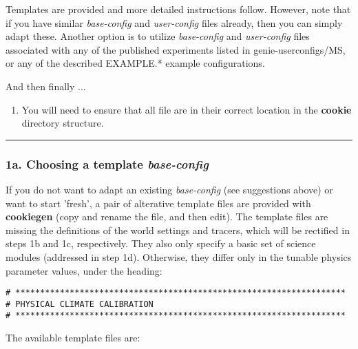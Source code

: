 Templates are provided and more detailed instructions follow. However, note that if you have similar \textit{base-config} and \textit{user-config} files already, then you can simply adapt these. Another option is to utilize \textit{base-config} and \textit{user-config} files associated with any of the published experiments listed in \textsf{\footnotesize genie-userconfigs/MS}, or any of the described \textsf{\footnotesize EXAMPLE.*} example configurations.

\vspace{1mm}
And then finally ...
\begin{enumerate}[noitemsep]
\vspace{1mm}
\setcounter{enumi}{2}
\item You will need to ensure that all file are in their correct location in the \textbf{cookie} directory structure.
\end{enumerate}
\vspace{1mm}

%
\noindent\rule{4cm}{0.5pt}
\subsubsection{1a. Choosing a template \textit{base-config}}

If you do not want to adapt an existing \textit{base-config} (see suggestions above) or want to start 'fresh', a pair of alterative template files are provided with \textbf{cookiegen} (copy and rename the file, and then edit). The template files are missing the definitions of the world settings and tracers, which will be rectified in steps 1b and 1c, respectively. They also only specify a basic set of science modules (addressed in step 1d). Otherwise, they differ only in the tunable physics parameter values, under the heading:

\footnotesize\vspace{-2pt}\begin{verbatim}
# *******************************************************************
# PHYSICAL CLIMATE CALIBRATION
# *******************************************************************
\end{verbatim}\vspace{-2pt}\normalsize

The available template files are:

